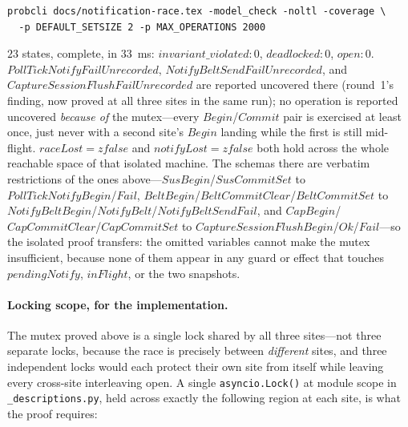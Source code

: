 \documentclass[a4paper,10pt,fleqn]{article}
\begin{document}
\begin{verbatim}
probcli docs/notification-race.tex -model_check -noltl -coverage \
  -p DEFAULT_SETSIZE 2 -p MAX_OPERATIONS 2000
\end{verbatim}

$23$ states, complete, in $33$~ms: $invariant\_violated{:}0$,
$deadlocked{:}0$, $open{:}0$.  $PollTickNotifyFailUnrecorded$,
$NotifyBeltSendFailUnrecorded$, and $CaptureSessionFlushFailUnrecorded$
are reported uncovered there (round~1's finding, now proved at all
three sites in the same run); no operation is reported uncovered
\emph{because of} the mutex---every $Begin$/$Commit$ pair is exercised
at least once, just never with a second site's $Begin$ landing while
the first is still mid-flight.  $raceLost = zfalse$ and $notifyLost =
zfalse$ both hold across the whole reachable space of that isolated
machine.  The schemas there are verbatim restrictions of the ones
above---$SusBegin$/$SusCommitSet$ to $PollTickNotifyBegin$/$Fail$,
$BeltBegin$/$BeltCommitClear$/$BeltCommitSet$ to
$NotifyBeltBegin$/$NotifyBelt$/$NotifyBeltSendFail$, and
$CapBegin$/$CapCommitClear$/$CapCommitSet$ to
$CaptureSessionFlushBegin$/$Ok$/$Fail$---so the isolated proof
transfers: the omitted variables cannot make the mutex insufficient,
because none of them appear in any guard or effect that touches
$pendingNotify$, $inFlight$, or the two snapshots.

\paragraph{Locking scope, for the implementation.}  The mutex proved
above is a single lock shared by all three sites---not three separate
locks, because the race is precisely between \emph{different} sites,
and three independent locks would each protect their own site from
itself while leaving every cross-site interleaving open.  A single
\texttt{asyncio.Lock()} at module scope in \texttt{\_descriptions.py},
held across exactly the following region at each site, is what the
proof requires:
\end{document}
